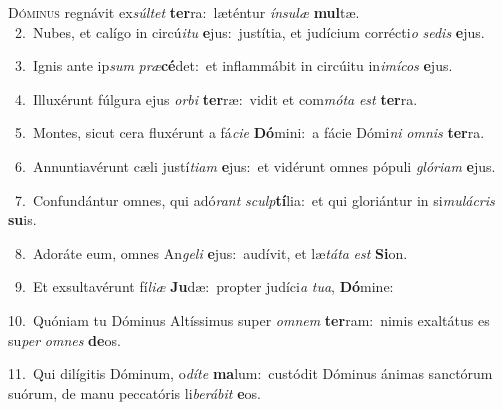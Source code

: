 \lettrine{\initial\textcolor{\initialcolor}{D}}{óminus} regnávit ex\-\textit{súl}\-\textit{tet} \textbf{ter}\-ra:~\star læténtur \textit{ín}\-\textit{su}\textit{læ} \textbf{mul}\-tæ.\\
{\numbfont\textcolor{\numbcolor}{~2.}}~Nubes, et calígo in circú\-\textit{i}\-\textit{tu} \textbf{e}\-jus:~\star justítia, et judícium corrécti\textit{o} \textit{se}\-\textit{dis} \textbf{e}\-jus.\par
{\numbfont\textcolor{\numbcolor}{~3.}}~Ignis ante ip\textit{sum} \textit{præ}\-\textbf{cé}det:~\star et inflammábit in circúitu in\-\textit{i}\-\textit{mí}\textit{cos} \textbf{e}\-jus.\par
{\numbfont\textcolor{\numbcolor}{~4.}}~Illuxérunt fúlgura ejus \textit{or}\-\textit{bi} \textbf{ter}\-ræ:~\star vidit et com\-\textit{mó}\-\textit{ta} \textit{est} \textbf{ter}\-ra.\par
{\numbfont\textcolor{\numbcolor}{~5.}}~Montes, sicut cera fluxérunt a fá\-\textit{ci}\-\textit{e} \textbf{Dó}\-mini:~\star a fácie Dómi\textit{ni} \textit{om}\-\textit{nis} \textbf{ter}\-ra.\par
{\numbfont\textcolor{\numbcolor}{~6.}}~Annuntiavérunt cæli justí\-\textit{ti}\-\textit{am} \textbf{e}\-jus:~\star et vidérunt omnes pópuli \textit{gló}\-\textit{ri}\textit{am} \textbf{e}\-jus.\par
{\numbfont\textcolor{\numbcolor}{~7.}}~Confundántur omnes, qui adó\textit{rant} \textit{sculp}\-\textbf{tí}lia:~\star et qui gloriántur in si\-\textit{mu}\-\textit{lá}\textit{cris} \textbf{su}\-is.\par
{\numbfont\textcolor{\numbcolor}{~8.}}~Adoráte eum, omnes An\-\textit{ge}\-\textit{li} \textbf{e}\-jus:~\star audívit, et læ\-\textit{tá}\-\textit{ta} \textit{est} \textbf{Si}\-on.\par
{\numbfont\textcolor{\numbcolor}{~9.}}~Et exsultavérunt fí\-\textit{li}\-\textit{æ} \textbf{Ju}\-dæ:~\star propter judíci\textit{a} \textit{tu}\-\textit{a}, \textbf{Dó}\-mine:\par
{\numbfont\textcolor{\numbcolor}{10.}}~Quóniam tu Dóminus Altíssimus super \textit{om}\-\textit{nem} \textbf{ter}\-ram:~\star nimis exaltátus es su\textit{per} \textit{om}\-\textit{nes} \textbf{de}\-os.\par
{\numbfont\textcolor{\numbcolor}{11.}}~Qui dilígitis Dóminum, o\-\textit{dí}\-\textit{te} \textbf{ma}\-lum:~\star custódit Dóminus ánimas sanctórum suórum, de manu peccatóris li\-\textit{be}\-\textit{rá}\textit{bit} \textbf{e}\-os.\par
